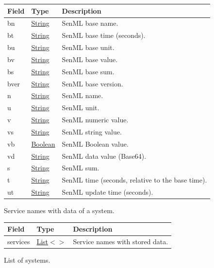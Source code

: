 \documentclass[a4paper]{arrowhead}
\newcommand{\pref}[1]{{\textcolor{ArrowheadGrey}{\hyperref[sec:model:primitives:#1]{#1}}}}
\begin{document}
\noindent\begin{tabularx}{\textwidth}{| >{\raggedright\arraybackslash}p{3.9cm} | >{\raggedright\arraybackslash\small}p{5.3cm} | X |} \hline
\rowcolor{gray!33} Field & Type & Description \\ \hline
bn & \pref{String} & SenML base name. \\ \hline
bt & \pref{String} & SenML base time (seconds). \\ \hline
bu & \pref{String} & SenML base unit. \\ \hline
bv & \pref{String} & SenML base value. \\ \hline
bs & \pref{String} & SenML base sum. \\ \hline
bver & \pref{String} & SenML base version. \\ \hline
n & \pref{String} & SenML name. \\ \hline
u & \pref{String} & SenML unit. \\ \hline
v & \pref{String} & SenML numeric value. \\ \hline
vs & \pref{String} & SenML string value. \\ \hline
vb & \pref{Boolean} & SenML Boolean value. \\ \hline
vd & \pref{String} & SenML data value (Base64). \\ \hline
s & \pref{String} & SenML sum. \\ \hline
t & \pref{String} & SenML time (seconds, relative to the base time). \\ \hline
ut & \pref{String} & SenML update time (seconds). \\ \hline
\end{tabularx}




Service names with data of a system.


\noindent\begin{tabularx}{\textwidth}{| >{\raggedright\arraybackslash}p{3.9cm} | >{\raggedright\arraybackslash\small}p{5.3cm} | X |} \hline
\rowcolor{gray!33} Field & Type & Description \\ \hline
services & \pref{List}$<$\allowbreak{}\pref{String}$>$ & Service names with stored data. \\ \hline
\end{tabularx}




List of systems.
\end{document}
